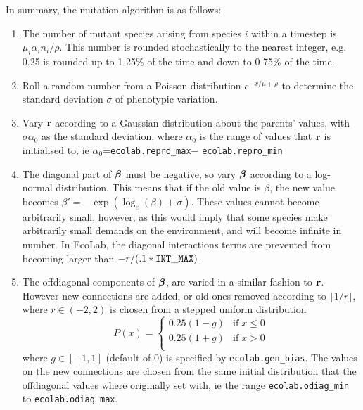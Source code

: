 \documentclass{article}
\newcommand{\br}{\mbox{${\bf r}$}} %
\newcommand{\bbeta}{\mbox{\boldmath{$\beta$}}}   %
\begin{document}
In summary, the mutation algorithm is as follows:
\begin{enumerate}
\item The number of mutant species arising from species $i$ within a
timestep is $\mu_i\alpha_in_i/\rho$. This number is rounded
stochastically to the nearest integer, e.g. 0.25 is rounded up to 1
25\% of the time and down to 0 75\% of the time.

\item Roll a random number from a Poisson distribution
$e^{-x/\mu+\rho}$ to determine the standard deviation $\sigma$ of phenotypic
variation. 

\item Vary $\br$ according to a Gaussian distribution about the
  parents' values, with $\sigma\alpha_0$ as the standard deviation,
  where $\alpha_0$ is the range of values that $\br$ is initialised to,
  ie $\alpha_0$=\verb|ecolab.repro_max|$-$
  \verb|ecolab.repro_min|

\item The diagonal part of $\bbeta$ must be negative, so vary $\bbeta$
according to a log-normal distribution. This means that if the old
value is $\beta$, the new value becomes
$\beta'=-\exp(\log_e(\beta)+\sigma)$. These values cannot become
arbitrarily small, however, as this would imply that some species make
arbitrarily small demands on the environment, and will become infinite
in number. In EcoLab, the diagonal interactions terms are prevented from
becoming larger than $-r/(.1*{\tt INT\_MAX})$.

\item The offdiagonal components of $\bbeta$, are varied in a similar
fashion to $\br$. However new connections are added, or old ones
removed according to $\lfloor 1/r\rfloor$, where $r\in(-2,2)$ is
chosen from a stepped uniform distribution 
\begin{displaymath}
P(x)=\left\{
\begin{array}{ll}
0.25(1-g) & \mathrm{if}\; x\leq0\\
0.25(1+g) & \mathrm{if}\; x>0\\
\end{array}
\right.
\end{displaymath}
where $g\in[-1,1]$ (default of 0) is specified by 
\verb+ecolab.gen_bias+. The values on
the new connections are chosen from the same initial distribution that
the offdiagonal values where originally set with, ie the range
\verb|ecolab.odiag_min| to
\verb|ecolab.odiag_max|. 


\end{enumerate}
\end{document}
